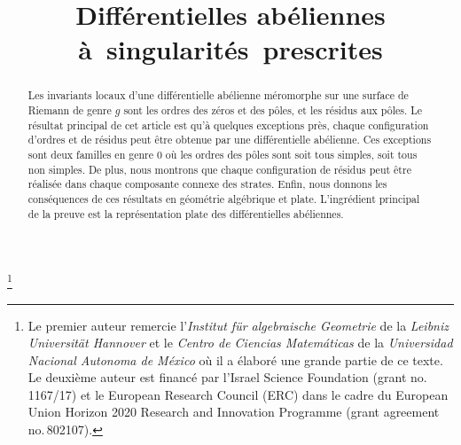 \documentclass[JEP,XML,SOM,Unicode,francais,NoFloatCountersInSection,published]{cedram}
\theoremstyle{definition}
\begin{document}
\frontmatter
\title{Différentielles abéliennes à~singularités~prescrites}

\author[\initial{Q.} \lastname{Gendron}]{ }
\address{Centro de Investigación en Matemáticas\\
Guanajuato, Gto., AP 402, CP 36000, México}
\urladdr{}

\author[\initial{G.} \lastname{Tahar}]{ }
\address{Faculty of Mathematics and Computer Science, Weizmann Institute of Science\\
Rehovot, 7610001, Israel}

\thanks{Le premier auteur remercie l'\emph{Institut für algebraische Geometrie} de la \emph{Leibniz Universität Hannover} et le \emph{Centro de Ciencias Matemáticas} de la \emph{Universidad Nacional Autonoma de México} où il a élaboré une grande partie de ce texte. Le deuxième auteur est financé par l’Israel Science Foundation (grant no.\,1167/17) et le European Research Council (ERC) dans le cadre du European Union Horizon 2020 Research and Innovation Programme (grant agreement no.\,802107).}

\begin{abstract}
Les invariants locaux d'une différentielle abélienne méromorphe sur une surface de Riemann de genre $g$ sont les ordres des zéros et des pôles, et les résidus aux pôles. Le résultat principal de cet article est qu'à quelques exceptions près, chaque configuration d'ordres et de résidus peut être obtenue par une différentielle abélienne. Ces exceptions sont deux familles en genre $0$ où les ordres des pôles sont soit tous simples, soit tous non simples. De plus, nous montrons que chaque configuration de résidus peut être réalisée dans chaque composante connexe des strates. Enfin, nous donnons les conséquences de ces résultats en géométrie algébrique et plate. L'ingrédient principal de la preuve est la représentation plate des différentielles abéliennes.
\end{abstract}




\end{document}
